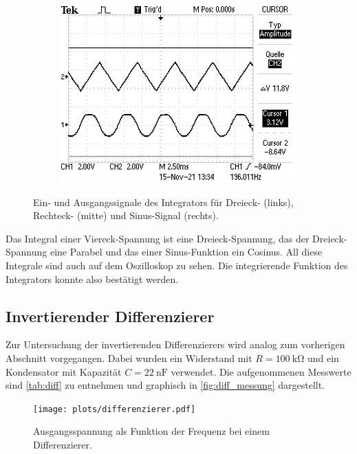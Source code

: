 \begin{figure}[H]
\begin{subfigure}{.4\textwidth}
  \end{subfigure}
  \begin{subfigure}{.4\textwidth}
    \includegraphics[width=\linewidth]{data/ALL0061/F0061TEK.JPG}
  \end{subfigure}
  \caption{Ein- und Ausgangssignale des Integrators für Dreieck- (links), Rechteck- (mitte) und Sinus-Signal (rechts).}
  \label{fig:int_oszi}
\end{figure}

Das Integral einer Viereck-Spannung ist eine Dreieck-Spannung, das der Dreieck-Spannung eine Parabel und das einer Sinus-Funktion ein Cosinus. All diese Integrale sind auch auf dem Oszilloskop zu sehen. Die integrierende Funktion des Integrators konnte also bestätigt werden.

\subsection{Invertierender Differenzierer}
Zur Untersuchung der invertierenden Differenzierers wird analog zum vorherigen Abschnitt vorgegangen. Dabei wurden ein Widerstand mit $R = \SI{100}{\kilo\ohm}$ und ein Kondensator mit Kapazität $C = \SI{22}{\nano\farad}$ verwendet. Die aufgenommenen Messwerte sind \autoref{tab:diff} zu entnehmen und graphisch in \autoref{fig:diff_messung} dargestellt.

\begin{figure}[H]
  \centering
  \texttt{[image: plots/differenzierer.pdf]}
  \caption{Ausgangsspannung als Funktion der Frequenz bei einem Differenzierer.}
  \label{fig:diff_messung}
\end{figure}

